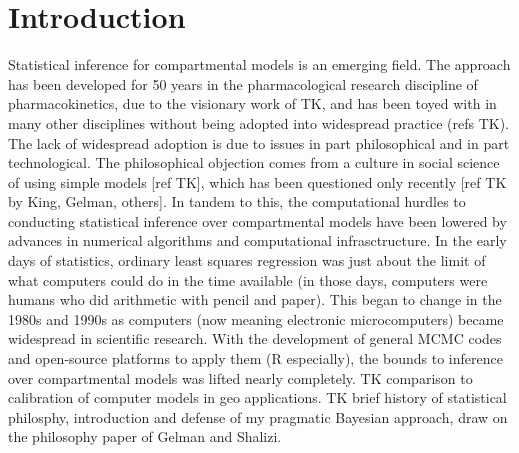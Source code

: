 \section{Introduction}
Statistical inference for compartmental models is an emerging
field. The approach has been developed for 50 years in the
pharmacological research discipline of pharmacokinetics, due to the
visionary work of TK, and has been toyed with in many other
disciplines without being adopted into widespread practice (refs
TK). The lack of widespread adoption is due to issues in part
philosophical and in part technological. The philosophical objection
comes from a culture in social science of using simple models [ref
  TK], which has been questioned only recently [ref TK by King,
  Gelman, others]. In tandem to this, the computational hurdles to
conducting statistical inference over compartmental models have been
lowered by advances in numerical algorithms and computational
infrasctructure. In the early days of statistics, ordinary least
squares regression was just about the limit of what computers could do
in the time available (in those days, computers were humans who did
arithmetic with pencil and paper). This began to change in the 1980s
and 1990s as computers (now meaning electronic microcomputers) became
widespread in scientific research. With the development of general
MCMC codes and open-source platforms to apply them (R especially), the
bounds to inference over compartmental models was lifted nearly
completely. TK comparison to calibration of computer models in geo
applications. TK brief history of statistical philosphy, introduction
and defense of my pragmatic Bayesian approach, draw on the philosophy
paper of Gelman and Shalizi.


